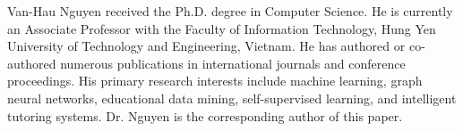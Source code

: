 \documentclass[10pt,journal,compsoc]{IEEEtran}
\begin{document}
\begin{IEEEbiographynophoto}{Van-Hau Nguyen}
received the Ph.D. degree in Computer Science. He is currently an Associate Professor with the Faculty of Information Technology, Hung Yen University of Technology and Engineering, Vietnam. He has authored or co-authored numerous publications in international journals and conference proceedings. His primary research interests include machine learning, graph neural networks, educational data mining, self-supervised learning, and intelligent tutoring systems. Dr. Nguyen is the corresponding author of this paper.
\end{IEEEbiographynophoto}
\end{document}
